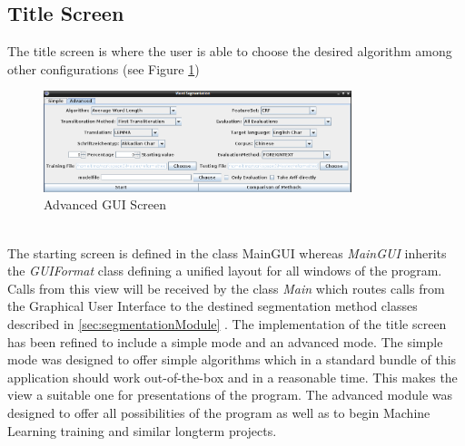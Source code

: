 \documentclass[10pt,a4paper,titlepage]{report}
\begin{document}
	\subsection{Title Screen}
	The title screen is where the user is able to choose the desired algorithm among other configurations (see Figure \ref{fig:advgui})
	\begin{figure}[htb]
		\centering
		\includegraphics[width=0.8\textwidth]{images/advgui.png}
		\caption{Advanced GUI Screen}
		\label{fig:advgui}
	\end{figure}
	\\
	The starting screen is defined in the class MainGUI whereas \textit{MainGUI} inherits the \textit{GUIFormat} class defining a unified layout for all windows of the program. Calls from this view will be received by the class \textit{Main} which routes calls from the Graphical User Interface to the destined segmentation method classes described in \ref{sec:segmentationModule} . 
	The implementation of the title screen has been refined to include a simple mode and an advanced mode. The simple mode was designed to offer simple algorithms which in a standard bundle of this application should work out-of-the-box and in a reasonable time. This makes the view a suitable one for presentations of the program. The advanced module was designed to offer all possibilities of the program as well as to begin Machine Learning training and similar longterm projects.
\end{document}
